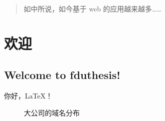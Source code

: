 \documentclass[type=master
]{fduthesis}
\begin{document}
\frontmatter

\tableofcontents

\begin{abstract}
    如\cite{samar1999single}中所说，如今基于 web  的应用越来越多……
\end{abstract}

\chapter{欢迎}
\section{Welcome to fduthesis!}
你好，\LaTeX{}！
\begin{figure}[htb]
    \centering
    \caption[大公司的域名分布]{%
        大公司的域名分布 }
\end{figure}

\backmatter

\printbibliography
\end{document}
